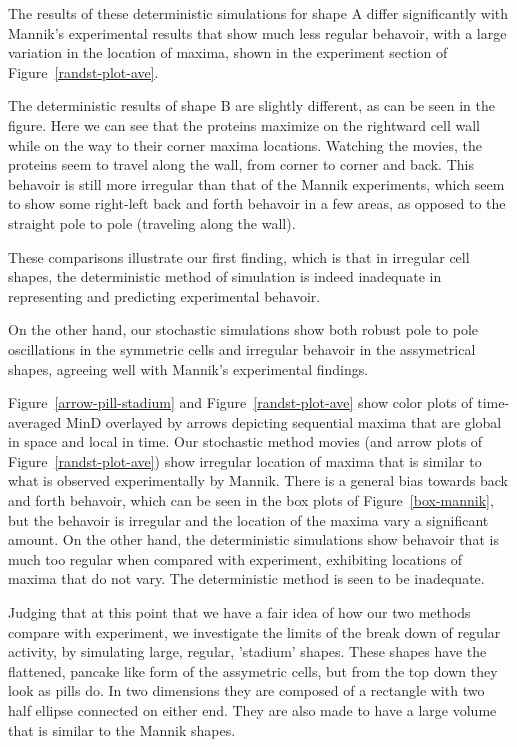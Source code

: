 \documentclass[letterpaper,twocolumn,amsmath,amssymb,pre]{revtex4-1}
\begin{document}
The results of these deterministic simulations for shape A differ
significantly with Mannik's experimental results that show much less
regular behavoir, with a large variation in the location of maxima,
shown in the experiment section of Figure~\ref{randst-plot-ave}.

The deterministic results of shape B are slightly different, as can be
seen in the figure.  Here we can see that the proteins maximize on the
rightward cell wall while on the way to their corner maxima locations.
Watching the movies, the proteins seem to travel along the wall, from
corner to corner and back.  This behavoir is still more irregular than
that of the Mannik experiments, which seem to show some right-left
back and forth behavoir in a few areas, as opposed to the straight
pole to pole (traveling along the wall).

These comparisons illustrate our first finding, which is that in
irregular cell shapes, the deterministic method of simulation is indeed
inadequate in representing and predicting experimental behavoir.

On the other hand, our stochastic simulations show both robust pole to
pole oscillations in the symmetric cells and irregular behavoir in the
assymetrical shapes, agreeing well with Mannik's experimental
findings.

Figure~\ref{arrow-pill-stadium} and Figure~\ref{randst-plot-ave} show
color plots of time-averaged MinD overlayed by arrows depicting
sequential maxima that are global in space and local in time.  Our
stochastic method movies (and arrow plots of
Figure~\ref{randst-plot-ave}) show irregular location of maxima that
is similar to what is observed experimentally by Mannik. There is a
general bias towards back and forth behavoir, which can be seen in the
box plots of Figure~\ref{box-mannik}, but the behavoir is irregular
and the location of the maxima vary a significant amount.  On the
other hand, the deterministic simulations show behavoir that is much
too regular when compared with experiment, exhibiting locations of
maxima that do not vary.  The deterministic method is seen to be
inadequate.

Judging that at this point that we have a fair idea of how our two
methods compare with experiment, we investigate the limits of the
break down of regular activity, by simulating large, regular,
'stadium' shapes.  These shapes have the flattened, pancake like form
of the assymetric cells, but from the top down they look as pills
do. In two dimensions they are composed of a rectangle with two half
ellipse connected on either end.  They are also made to have a large
volume that is similar to the Mannik shapes.
\end{document}

